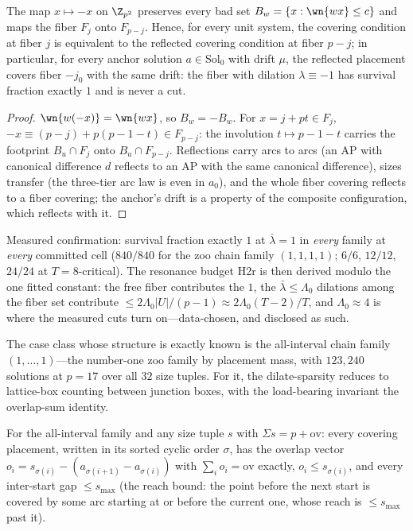 \begin{lemma}\label{lem:reflect}
The map $x\mapsto-x$ on $\Z_{p^2}$ preserves every bad set
$B_w=\{x:\wn{wx}\le c\}$ and maps the fiber $F_j$ onto $F_{p-j}$. Hence,
for every unit system, the covering condition at fiber $j$ is
equivalent to the reflected covering condition at fiber $p-j$; in
particular, for every anchor solution $a\in\mathrm{Sol}_0$ with drift
$\mu$, the reflected placement covers fiber $-j_0$ with the same drift:
the fiber with dilation $\lambda\equiv-1$ has survival fraction exactly
$1$ and is never a cut.
\end{lemma}

\begin{proof}
$\wn{w(-x)}=\wn{wx}$, so $B_w=-B_w$. For $x=j+pt\in F_j$,
$-x\equiv(p-j)+p(p-1-t)\in F_{p-j}$: the involution
$t\mapsto p-1-t$ carries the footprint $B_u\cap F_j$ onto
$B_u\cap F_{p-j}$. Reflections carry arcs to arcs (an AP with canonical
difference $d$ reflects to an AP with the same canonical difference),
sizes transfer (the three-tier arc law is even in $a_0$), and the whole
fiber covering reflects to a fiber covering; the anchor's drift is a
property of the composite configuration, which reflects with it.
\end{proof}

Measured confirmation: survival fraction exactly $1$ at
$\bar\lambda=1$ in \emph{every} family at \emph{every} committed cell
($840/840$ for the zoo chain family $(1,1,1,1)$; $6/6$, $12/12$,
$24/24$ at $T=8$-critical). The resonance budget H2r is then derived
modulo the one fitted constant: the free fiber contributes the $1$, the
$\bar\lambda\le\Lambda_0$ dilations among the fiber set contribute
$\le 2\Lambda_0|U|/(p-1)\approx2\Lambda_0(T-2)/T$, and $\Lambda_0\approx4$
is where the measured cuts turn on---data-chosen, and disclosed as
such.

The case class whose structure is exactly known is the all-interval
chain family $(1,\dots,1)$---the number-one zoo family by placement
mass, with $123{,}240$ solutions at $p=17$ over all $32$ size tuples.
For it, the dilate-sparsity reduces to lattice-box counting between
junction boxes, with the load-bearing invariant the overlap-sum
identity.

\begin{lemma}\label{lem:overlapsum}
For the all-interval family and any size tuple $s$ with
$\Sigma s=p+\mathrm{ov}$: every covering placement, written in its
sorted cyclic order $\sigma$, has the overlap vector
$o_i=s_{\sigma(i)}-(a_{\sigma(i+1)}-a_{\sigma(i)})$ with
$\sum_i o_i=\mathrm{ov}$ exactly, $o_i\le s_{\sigma(i)}$, and every
inter-start gap $\le s_{\max}$ (the reach bound: the point before the
next start is covered by some arc starting at or before the current
one, whose reach is $\le s_{\max}$ past it).
\end{lemma}

